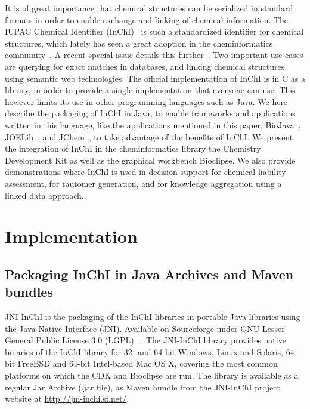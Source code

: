 \documentclass[10pt]{bmc_article}
\newenvironment{bmcformat}{\fussy\setboolean{publ}{true}}{\fussy}
\begin{document}
\begin{bmcformat}
It is of great importance that chemical structures can be serialized in standard formats in order to enable exchange and linking of chemical information. The IUPAC Chemical Identifier (InChI)~\cite{Heller2012} is such a standardized identifier for chemical structures, which lately has seen a great adoption in the cheminformatics community~\cite{OBoyle:2011fk}. A recent special issue details this further~\cite{Williams2012}. Two important use cases are querying for exact matches in databases, and linking chemical structures using semantic web technologies. The official implementation of InChI is in C as a library, in order to provide a single implementation that everyone can use. This however limits its use in other programming languages such as Java. We here describe the packaging of InChI in Java, to enable frameworks and applications written in this language, like the applications mentioned in this paper, BioJava~\cite{BioJava}, JOELib~\cite{Wegner2006}, and JChem~\cite{ChemAxon}, to take advantage of the benefits of InChI. We present the integration of InChI in the cheminformatics library the Chemistry Development Kit as well as the graphical workbench Bioclipse. We also provide demonstrations where InChI is used in decision support for chemical liability assessment, for tautomer generation, and for knowledge aggregation using a linked data approach.
 




\section*{Implementation}

\subsection*{Packaging InChI in Java Archives and Maven bundles}

JNI-InChI is the packaging of the InChI libraries in portable Java libraries using the Java Native Interface (JNI).
Available on Sourceforge under GNU Lesser General Public License 3.0 (LGPL) ~\cite{JNIINCHIURL}.
The JNI-InChI library provides native binaries of the InChI library for 32- and 64-bit Windows, Linux and Solaris,
64-bit FreeBSD and 64-bit Intel-based Mac OS X, covering the most common platforms on which the CDK and Bioclipse are run.
The library is available as a regular Jar Archive (.jar file), as Maven bundle from the JNI-InChI project website
at \url{http://jni-inchi.sf.net/}.


\end{bmcformat}
\end{document}
